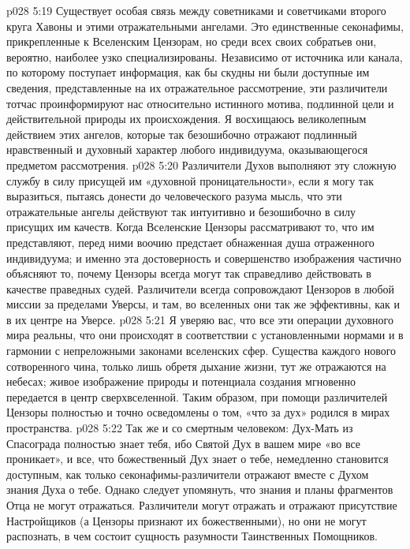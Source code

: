 \vs p028 5:19 \pc {}\bibnobreakspace {} Существует особая связь между советниками и советчиками второго круга Хавоны и этими отражательными ангелами. Это единственные секонафимы, прикрепленные к Вселенским Цензорам, но среди всех своих собратьев они, вероятно, наиболее узко специализированы. Независимо от источника или канала, по которому поступает информация, как бы скудны ни были доступные им сведения, представленные на их отражательное рассмотрение, эти различители тотчас проинформируют нас относительно истинного мотива, подлинной цели и действительной природы их происхождения. Я восхищаюсь великолепным действием этих ангелов, которые так безошибочно отражают подлинный нравственный и духовный характер любого индивидуума, оказывающегося предметом рассмотрения.
\vs p028 5:20 Различители Духов выполняют эту сложную службу в силу присущей им «духовной проницательности», если я могу так выразиться, пытаясь донести до человеческого разума мысль, что эти отражательные ангелы действуют так интуитивно и безошибочно в силу присущих им качеств. Когда Вселенские Цензоры рассматривают то, что им представляют, перед ними воочию предстает обнаженная душа отраженного индивидуума; и именно эта достоверность и совершенство изображения частично объясняют то, почему Цензоры всегда могут так справедливо действовать в качестве праведных судей. Различители всегда сопровождают Цензоров в любой миссии за пределами Уверсы, и там, во вселенных они так же эффективны, как и в их центре на Уверсе.
\vs p028 5:21 Я уверяю вас, что все эти операции духовного мира реальны, что они происходят в соответствии с установленными нормами и в гармонии с непреложными законами вселенских сфер. Существа каждого нового сотворенного чина, только лишь обретя дыхание жизни, тут же отражаются на небесах; живое изображение природы и потенциала создания мгновенно передается в центр сверхвселенной. Таким образом, при помощи различителей Цензоры полностью и точно осведомлены о том, «что за дух» родился в мирах пространства.
\vs p028 5:22 Так же и со смертным человеком: Дух\hyp{}Мать из Спасограда полностью знает тебя, ибо Святой Дух в вашем мире «во все проникает», и все, что божественный Дух знает о тебе, немедленно становится доступным, как только секонафимы\hyp{}различители отражают вместе с Духом знания Духа о тебе. Однако следует упомянуть, что знания и планы фрагментов Отца не могут отражаться. Различители могут отражать и отражают присутствие Настройщиков (а Цензоры признают их божественными), но они не могут распознать, в чем состоит сущность разумности Таинственных Помощников.
